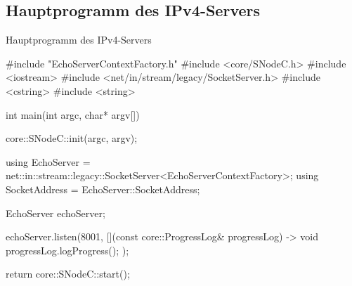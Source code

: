 \subsection{Hauptprogramm des IPv4-Servers}

\begin{frame}[fragile]{Hauptprogramm des IPv4-Servers}
  \begin{cppcode}[autogobble=true]
    #include "EchoServerContextFactory.h"
    #include <core/SNodeC.h>
    #include <iostream>
    #include <net/in/stream/legacy/SocketServer.h>
    #include <cstring>
    #include <string>

    int main(int argc, char* argv[]) {
      core::SNodeC::init(argc, argv);

      using EchoServer = net::in::stream::legacy::SocketServer<EchoServerContextFactory>;
      using SocketAddress = EchoServer::SocketAddress;

      EchoServer echoServer;

      echoServer.listen(8001, [](const core::ProgressLog& progressLog) -> void {
        progressLog.logProgress();
      });

      return core::SNodeC::start();
    }
  \end{cppcode}
\end{frame}
